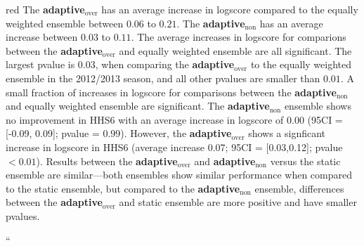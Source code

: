 \documentclass[
  fontsize=11pt,
  paper=a4,
  parskip=half,
  enlargefirstpage=on,    %
  fromalign=right,        %
  fromphone=on,           %
  fromrule=aftername,     %
  addrfield=on,           %
  backaddress=on,         %
  subject=beforeopening,  %
  locfield=narrow,        %
  foldmarks=on,           %
]{scrlttr2}
\def\adaptNon{\textbf{adaptive$_{\text{non}}$ }}
\def\adaptOver{\textbf{adaptive$_{\text{over}}$ }}
\begin{document}
\begin{commt}{red}
      The \adaptOver has an average increase in logscore compared to the equally weighted ensemble between $0.06$ to $0.21$.
      The \adaptNon has an average increase between $0.03$ to $0.11$.
      The average increases in logscore for comparions between the \adaptOver and equally weighted ensemble are all significant. The largest pvalue is $0.03$, when comparing the \adaptOver to the equally weighted ensemble in the 2012/2013 season, and all other pvalues are smaller than $0.01$.
      A small fraction of increases in logscore for comparisons between the \adaptNon and equally weighted ensemble are significant.
      The \adaptNon ensemble shows no improvement in HHS6 with an average increase in logscore of 0.00 (95CI = [-0.09, 0.09]; pvalue = $0.99$).
      However, the \adaptOver shows a signficant increase in logscore in HHS6 (average increase 0.07; 95CI = [0.03,0.12]; pvalue $< 0.01$). 
      Results between the \adaptOver and \adaptNon versus the static ensemble are similar---both ensembles show similar performance when compared to the static ensemble, but compared to the \adaptNon ensemble, differences between the \adaptOver and static ensemble are more positive and have smaller pvalues.
      
``

      
    \end{commt}
\end{document}

